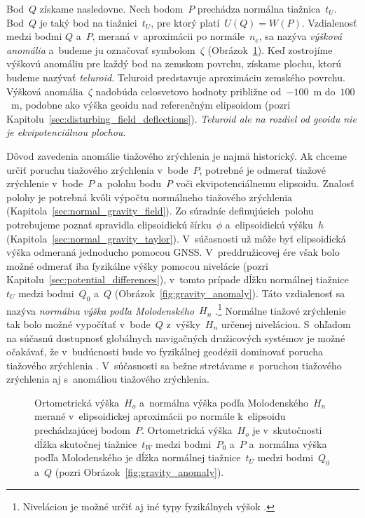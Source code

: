 \documentclass[a4paper,12pt]{book}
\begin{document}
Bod~$Q$ získame nasledovne.  Nech bodom~$P$ prechádza normálna tiažnica~$t_U$.  
Bod~$Q$ je taký bod na tiažnici~$t_U$, pre ktorý platí~$U(Q) = W(P)$.  
Vzdialenosť medzi bodmi $Q$ a~$P$, meraná v~aproximácii po normále~$n_e$, sa 
nazýva \emph{výšková anomália} a~budeme ju označovať symbolom~$\zeta$ 
(Obrázok~\ref{fig:heights}).  Keď zostrojíme výškovú anomáliu pre každý bod na 
zemskom povrchu, získame plochu, ktorú budeme nazývať \emph{teluroid}.  
Teluroid predstavuje aproximáciu zemského povrchu.  Výšková anomália~$\zeta$ 
nadobúda celosvetovo hodnoty približne od~$-100$~m do~$100$~m, podobne ako 
výška geoidu nad referenčným elipsoidom (pozri 
Kapitolu~\ref{sec:disturbing_field_deflections}).  \emph{Teluroid ale na 
rozdiel od geoidu nie je ekvipotenciálnou plochou}.

Dôvod zavedenia anomálie tiažového zrýchlenia je najmä historický.  Ak chceme 
určiť poruchu tiažového zrýchlenia v~bode~$P$, potrebné je odmerať tiažové 
zrýchlenie v~bode~$P$ a~polohu bodu~$P$ voči ekvipotenciálnemu elipsoidu.  
Znalosť polohy je potrebná kvôli výpočtu normálneho tiažového zrýchlenia 
(Kapitola~\ref{sec:normal_gravity_field}).  Zo súradníc definujúcich~polohu 
potrebujeme poznať spravidla elipsoidickú šírku~$\phi$ a~elipsoidickú výšku~$h$ 
(Kapitola~\ref{sec:normal_gravity_taylor}).  V~súčasnosti už môže byť 
elipsoidická výška odmeraná jednoducho pomocou GNSS.  V~preddružicovej ére však 
bolo možné odmerať iba fyzikálne výšky pomocou nivelácie (pozri 
Kapitolu~\ref{sec:potential_differences}), v~tomto prípade dĺžku normálnej 
tiažnice~$t_U$ medzi bodmi~$Q_0$ a~$Q$ (Obrázok~\ref{fig:gravity_anomaly}).  
Táto vzdialenosť sa nazýva \emph{normálna výška podľa Molodenského}~$H_n$ 
\parencite{MoritzPhysicalGeodesy}.\footnote{Niveláciou je možné určiť aj iné 
typy fyzikálnych výšok \parencite[pozri napríklad][]{MoritzPhysicalGeodesy}.}  
Normálne tiažové zrýchlenie tak bolo možné vypočítať v~bode~$Q$ z~výšky~$H_n$ 
určenej niveláciou.  S~ohľadom na súčasnú dostupnosť globálnych navigačných 
družicových systémov je možné očakávať, že v~budúcnosti bude vo fyzikálnej 
geodézii dominovať porucha tiažového zrýchlenia 
\parencite{MoritzPhysicalGeodesy}.  V~súčasnosti sa bežne stretávame s~poruchou 
tiažového zrýchlenia aj s~anomáliou tiažového zrýchlenia.

\begin{figure}[bt]
\centering

\caption{Ortometrická výška~$H_o$ a~normálna výška podľa Molodenského~$H_n$ 
merané v~elipsoidickej aproximácii po normále k~elipsoidu prechádzajúcej 
bodom~$P$.  Ortometrická výška~$H_o$ je v~skutočnosti dĺžka skutočnej 
tiažnice~$t_W$ medzi bodmi~$P_0$ a~$P$ a~normálna výška podľa Molodenského je 
dĺžka normálnej tiažnice~$t_U$ medzi bodmi~$Q_0$ a~$Q$ (pozri 
Obrázok~\ref{fig:gravity_anomaly}).}
\label{fig:heights}
\end{figure}
\end{document}
